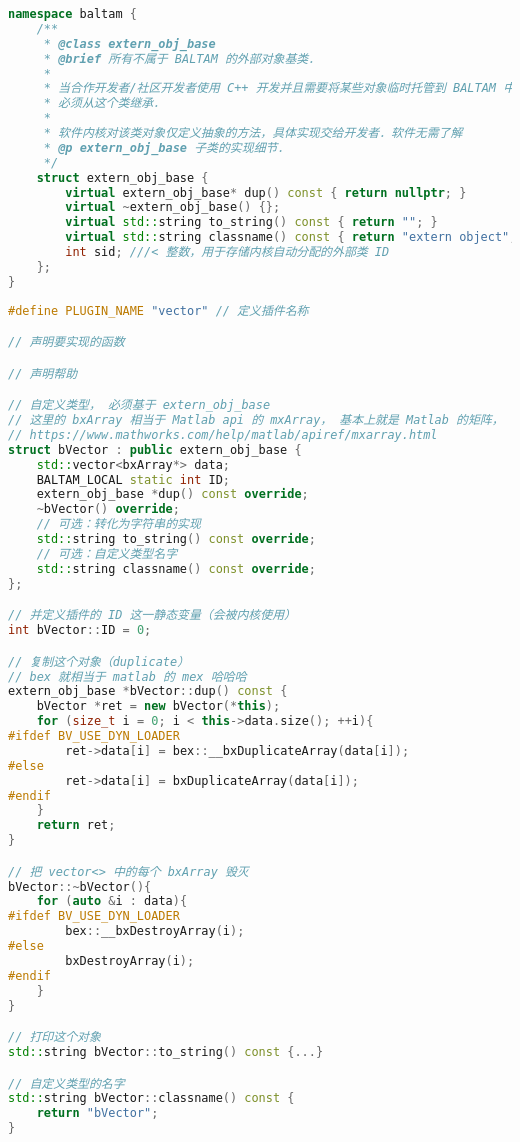 
\begin{issues}
\issueDraft
\end{issues}

\begin{lstlisting}[language=cpp, caption=extern\_obj.h节选]
namespace baltam {
    /**
     * @class extern_obj_base
     * @brief 所有不属于 BALTAM 的外部对象基类．
     *
     * 当合作开发者/社区开发者使用 C++ 开发并且需要将某些对象临时托管到 BALTAM 中时，
     * 必须从这个类继承．
     *
     * 软件内核对该类对象仅定义抽象的方法，具体实现交给开发者．软件无需了解
     * @p extern_obj_base 子类的实现细节．
     */
    struct extern_obj_base {
        virtual extern_obj_base* dup() const { return nullptr; }
        virtual ~extern_obj_base() {};
        virtual std::string to_string() const { return ""; }
        virtual std::string classname() const { return "extern object"; };
        int sid; ///< 整数，用于存储内核自动分配的外部类 ID
    };
}
\end{lstlisting}


\begin{lstlisting}[language=cpp,caption=vector 插件的 main.cpp]
#define PLUGIN_NAME "vector" // 定义插件名称

// 声明要实现的函数

// 声明帮助

// 自定义类型， 必须基于 extern_obj_base
// 这里的 bxArray 相当于 Matlab api 的 mxArray， 基本上就是 Matlab 的矩阵， 什么都能装．
// https://www.mathworks.com/help/matlab/apiref/mxarray.html
struct bVector : public extern_obj_base {
    std::vector<bxArray*> data;
    BALTAM_LOCAL static int ID;
    extern_obj_base *dup() const override;
    ~bVector() override;
    // 可选：转化为字符串的实现
    std::string to_string() const override;
    // 可选：自定义类型名字
    std::string classname() const override;
};

// 并定义插件的 ID 这一静态变量（会被内核使用）
int bVector::ID = 0;

// 复制这个对象（duplicate）
// bex 就相当于 matlab 的 mex 哈哈哈
extern_obj_base *bVector::dup() const {
    bVector *ret = new bVector(*this);
    for (size_t i = 0; i < this->data.size(); ++i){
#ifdef BV_USE_DYN_LOADER
        ret->data[i] = bex::__bxDuplicateArray(data[i]);
#else
        ret->data[i] = bxDuplicateArray(data[i]);
#endif
    }
    return ret;
}

// 把 vector<> 中的每个 bxArray 毁灭
bVector::~bVector(){
    for (auto &i : data){
#ifdef BV_USE_DYN_LOADER
        bex::__bxDestroyArray(i);
#else
        bxDestroyArray(i);
#endif
    }
}

// 打印这个对象
std::string bVector::to_string() const {...}

// 自定义类型的名字
std::string bVector::classname() const {
    return "bVector";
}
\end{lstlisting}